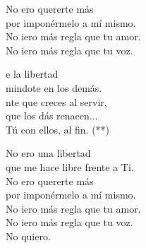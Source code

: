 \begin{cancion}
\begin{chorus}
	No ero quererte más\\
por imponérmelo a mí mismo.\\
	No iero más regla que tu amor.\\
	No iero más regla que tu voz.\\
	\end{chorus}%
	e la libertad\\
	mindote en los demás.\\
	nte que creces al servir,\\
	que los dás renacen... \\
Tú con ellos, al fin. (**)\\
	\begin{chorus}%
	No ero una libertad \\
que me hace libre frente a Ti.\\
	No ero quererte más\\
por imponérmelo a mí mismo.\\
	No iero más regla que tu amor.\\
	No iero más regla que tu voz.\\
	No quiero.\\
	\end{chorus}%
\end{cancion}%
